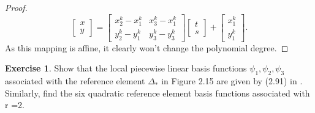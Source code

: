 \documentclass{amsart}
\theoremstyle{plain}
\theoremstyle{definition}
\newtheorem{exer}{Exercise}[section]
\begin{document}
\begin{proof}
$$\begin{bmatrix}
        x\\y
    \end{bmatrix}=\begin{bmatrix}
        x_2^k-x_1^k & x_3^k-x_1^k\\
        y_2^k -y_1^k & y_3^k-y_3^k
    \end{bmatrix}\begin{bmatrix}
        t\\s
    \end{bmatrix}+\begin{bmatrix}
        x_1^k\\y_1^k
    \end{bmatrix}.$$
    As this mapping is affine, it clearly won't change the polynomial degree.
\end{proof}

\begin{exer}
    Show that the local piecewise linear basis functions $\psi_1, \psi_2,\psi_3$ associated with the reference element $\Delta_*$ in Figure 2.15 are given by (2.91) in \cite{lord2014introduction}. Similarly, find the six quadratic reference element basis functions associated with r =2. 
\end{exer}
\end{document}
